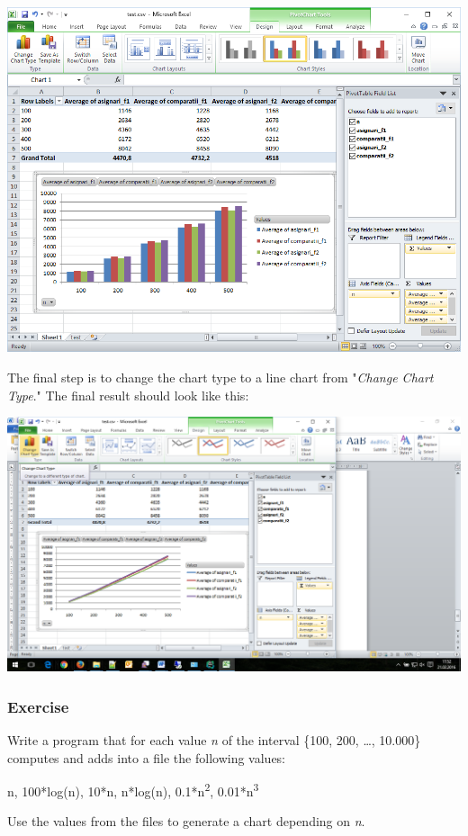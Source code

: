 \documentclass[../en-fa-lab.tex]{subfiles}
\begin{document}
\includegraphics[width=\textwidth]{../Resources/lab0/image14.png}

The final step is to change the chart type to a line chart from
"\emph{Change Chart Type}." The final result should look like this:

\includegraphics[width=\textwidth]{../Resources/lab0/image15.png}

\subsubsection{Exercise}\label{exerciux21biu}

Write a program that for each value \emph{n} of the interval \{100, 200,
\ldots, 10.000\} computes and adds into a file the following values:

n, 100*log(n), 10*n, n*log(n), 0.1*n\textsuperscript{2},
0.01*n\textsuperscript{3}

Use the values from the files to generate a chart depending on \emph{n}.
\end{document}
